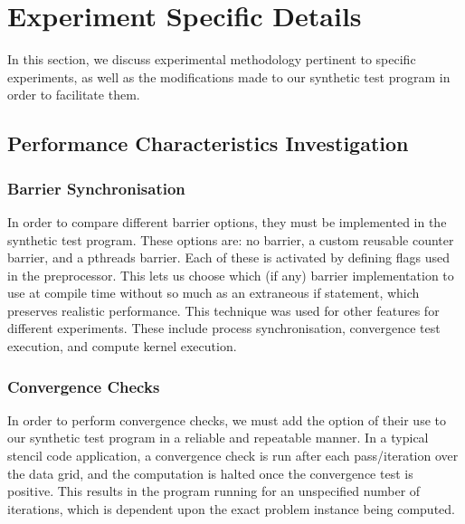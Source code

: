 \section{Experiment Specific Details}
\label{section:experimental_methodology:experiment_specific_details}

In this section, we discuss experimental methodology pertinent to specific experiments, as well as the modifications made to our synthetic test program in order to facilitate them.



\subsection{Performance Characteristics Investigation}
\label{section:experimental_methodology:performance_characteristics_investigation}

\subsubsection{Barrier Synchronisation}
\label{section:experimental_methodology:barrier_syncronisation}

In order to compare different barrier options, they must be implemented in the synthetic test program. These options are: no barrier, a custom reusable counter barrier, and a pthreads barrier. Each of these is activated by defining flags used in the preprocessor. This lets us choose which (if any) barrier implementation to use at compile time without so much as an extraneous if statement, which preserves realistic performance. This technique was used for other features for different experiments. These include process synchronisation, convergence test execution, and compute kernel execution.



\subsubsection{Convergence Checks}
\label{section:experimental_methodology:convergence_checks}

In order to perform convergence checks, we must add the option of their use to our synthetic test program in a reliable and repeatable manner. In a typical stencil code application, a convergence check is run after each pass/iteration over the data grid, and the computation is halted once the convergence test is positive. This results in the program running for an unspecified number of iterations, which is dependent upon the exact problem instance being computed.

